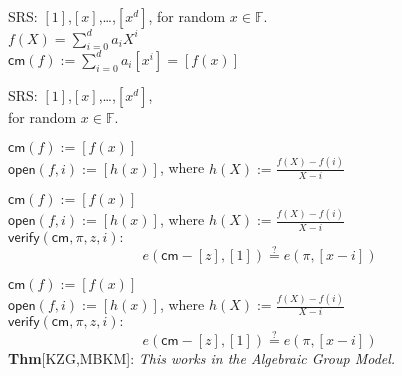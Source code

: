 \documentclass[shadesubsections,trans,14pt,mathserif]{beamer}
\newcommand{\F}{\ensuremath{\mathbb F}}
\newcommand{\enc}[1]{\ensuremath{\left[#1\right ]}}
\newcommand{\cm}{\ensuremath{\mathsf{cm}}}
\newcommand{\open}[1]{\ensuremath{\mathsf{open}(#1)}}
\newcommand{\verify}[1]{\ensuremath{\mathsf{verify}(#1)}}
\newcommand{\defeq}{\ensuremath{:=}}
\begin{document}
\begin{frame}
 SRS: \enc{1},\enc{x},\ldots,\enc{x^d}, for random $x\in \F$.\\
 \vspace{0.4in}
 $f(X) = \sum_{i=0}^d a_i X^i$\\
 \vspace{0.4in}
 $\cm(f)\defeq  \sum_{i=0}^d a_i \enc{x^i}=  \enc{f(x)}$\\
 \vspace{0.4in}
 
\end{frame}
\begin{frame}
 SRS: \enc{1},\enc{x},\ldots,\enc{x^d},\\
 for random $x\in \F$.
 \vspace{0.4in}
 
 $\cm(f)\defeq   \enc{f(x)}$\\
 \vspace{0.4in}
$\open{f,i}\defeq \enc{h(x)}$, where
$h(X)\defeq \frac{f(X)-f(i)}{X-i}$
 \vspace{0.4in}
 
\end{frame}

% 




\begin{frame}

 $\cm(f)\defeq   \enc{f(x)}$\\
 \vspace{0.4in}
$\open{f,i}\defeq \enc{h(x)}$, where
 $h(X)\defeq \frac{f(X)-f(i)}{X-i}$\\
 \vspace{0.4in}
 $\verify{\cm,\pi,z,i}:$
\[e(\cm-\enc{z},\enc{1}) \stackrel{?}{=} e(\pi, \enc{x-i})\]
\end{frame}


 


\begin{frame}

 $\cm(f)\defeq   \enc{f(x)}$\\
 \vspace{0.4in}
$\open{f,i}\defeq \enc{h(x)}$, where
 $h(X)\defeq \frac{f(X)-f(i)}{X-i}$\\
 \vspace{0.4in}
 $\verify{\cm,\pi,z,i}:$
\[e(\cm-\enc{z},\enc{1}) \stackrel{?}{=} e(\pi, \enc{x-i})\]
 \vspace{0.4in}
\textbf{Thm}{\footnotesize{[KZG,MBKM]}}: \emph{This works in the Algebraic Group Model.}
 \end{frame}
\end{document}
